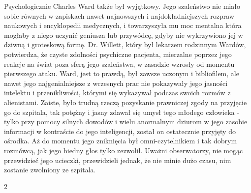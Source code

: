 Psychologicznie Charles Ward także był wyjątkowy. Jego szaleństwo nie miało sobie równych w zapiskach nawet najnowszych i najdokładniejszych rozpraw naukowych i encyklopedii medycznych, i towarzyszyła mu moc mentalna która mogłaby z niego uczynić geniusza lub przywódcę, gdyby nie wykrzywiono jej w dziwną i groteskową formę. Dr. Willett, który był lekarzem rodzinnym Wardów, potwierdza, że czyste zdolności psychiczne pacjenta, mierzalne poprzez jego reakcje na świat poza sferą jego szaleństwa, w zasadzie wzrosły od momentu pierwszego ataku. Ward, jest to prawdą, był zawsze uczonym i bibliofilem, ale nawet jego najgenialniejsze z wczesnych prac nie pokazywały jego jasności intelektu i przenikliwości, którymi się wykazywał podczas swoich rozmów z alienistami. Zaiste, było trudną rzeczą pozyskanie prawniczej zgody na przyjęcie go do szpitala, tak potężny i jasny zdawał się umysł tego młodego człowieka - tylko przy pomocy silnych dowodów i wielu anormalnym dziurom w jego zasobie informacji w kontraście do jego inteligencji, został on ostatecznie przyjęty do ośrodka. Aż do momentu jego zniknięcia był omni-czytelnikiem i tak dobrym rozmówcą, jak jego biedny głos tylko zezwolił. Uważni obserwatorzy, nie mogąc przewidzieć jego ucieczki, przewidzieli jednak, że nie minie dużo czasu, nim zostanie zwolniony ze szpitala.

\begin{center}
2
\end{center}

